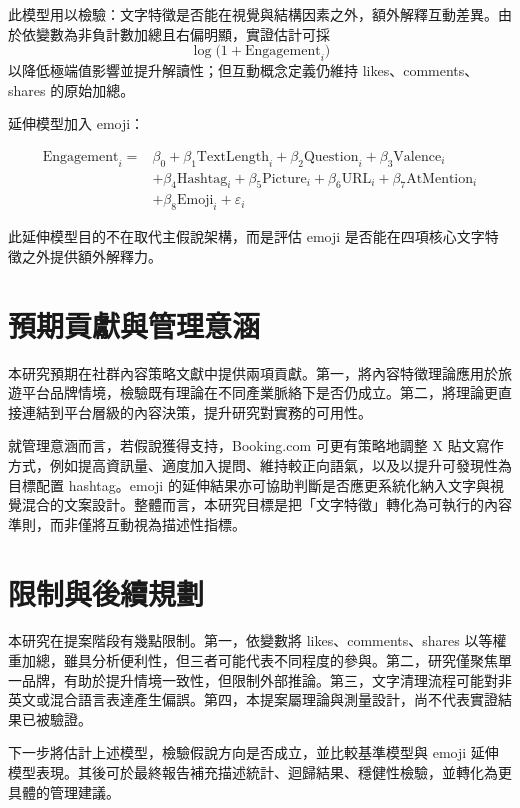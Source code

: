 \documentclass[12pt,a4paper]{ctexart}
\begin{document}
此模型用以檢驗：文字特徵是否能在視覺與結構因素之外，額外解釋互動差異。由於依變數為非負計數加總且右偏明顯，實證估計可採
\[
\log\bigl(1 + \text{Engagement}_i\bigr)
\]
以降低極端值影響並提升解讀性；但互動概念定義仍維持 likes、comments、shares 的原始加總。

延伸模型加入 emoji：

\begin{equation}
\begin{aligned}
\text{Engagement}_i = {}& \beta_0 + \beta_1\text{TextLength}_i + \beta_2\text{Question}_i + \beta_3\text{Valence}_i \\
& + \beta_4\text{Hashtag}_i + \beta_5\text{Picture}_i + \beta_6\text{URL}_i + \beta_7\text{AtMention}_i \\
& + \beta_8\text{Emoji}_i + \varepsilon_i
\end{aligned}
\end{equation}

此延伸模型目的不在取代主假說架構，而是評估 emoji 是否能在四項核心文字特徵之外提供額外解釋力。

\section{預期貢獻與管理意涵}
本研究預期在社群內容策略文獻中提供兩項貢獻。第一，將內容特徵理論應用於旅遊平台品牌情境，檢驗既有理論在不同產業脈絡下是否仍成立。第二，將理論更直接連結到平台層級的內容決策，提升研究對實務的可用性。

就管理意涵而言，若假說獲得支持，Booking.com 可更有策略地調整 X 貼文寫作方式，例如提高資訊量、適度加入提問、維持較正向語氣，以及以提升可發現性為目標配置 hashtag。emoji 的延伸結果亦可協助判斷是否應更系統化納入文字與視覺混合的文案設計。整體而言，本研究目標是把「文字特徵」轉化為可執行的內容準則，而非僅將互動視為描述性指標。

\section{限制與後續規劃}
本研究在提案階段有幾點限制。第一，依變數將 likes、comments、shares 以等權重加總，雖具分析便利性，但三者可能代表不同程度的參與。第二，研究僅聚焦單一品牌，有助於提升情境一致性，但限制外部推論。第三，文字清理流程可能對非英文或混合語言表達產生偏誤。第四，本提案屬理論與測量設計，尚不代表實證結果已被驗證。

下一步將估計上述模型，檢驗假說方向是否成立，並比較基準模型與 emoji 延伸模型表現。其後可於最終報告補充描述統計、迴歸結果、穩健性檢驗，並轉化為更具體的管理建議。
\end{document}

